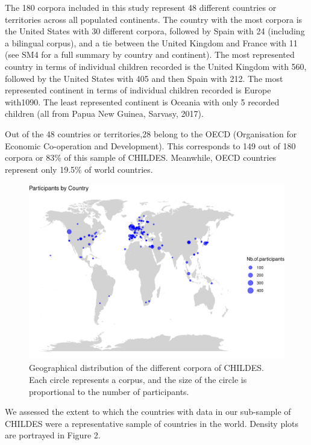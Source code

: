 \documentclass[
  man,floatsintext]{apa6}
\begin{document}
The 180 corpora included in this study represent 48 different countries or territories across all populated continents. The country with the most corpora is the United States with 30 different corpora, followed by Spain with 24 (including a bilingual corpus), and a tie between the United Kingdom and France with 11 (see SM4 for a full summary by country and continent). The most represented country in terms of individual children recorded is the United Kingdom with 560, followed by the United States with 405 and then Spain with 212. The most represented continent in terms of individual children recorded is Europe with1090. The least represented continent is Oceania with only 5 recorded children (all from Papua New Guinea, Sarvasy, 2017).

Out of the 48 countries or territories,28 belong to the OECD (Organisation for Economic Co-operation and Development). This corresponds to 149 out of 180 corpora or 83\% of this sample of CHILDES. Meanwhile, OECD countries represent only 19.5\% of world countries.

\begin{figure}
\centering
\includegraphics{CHILDES_short_files/figure-latex/unnamed-chunk-1-1.pdf}
\caption{\label{fig:unnamed-chunk-1}Geographical distribution of the different corpora of CHILDES. Each circle represents a corpus, and the size of the circle is proportional to the number of participants.}
\end{figure}

We assessed the extent to which the countries with data in our sub-sample of CHILDES were a representative sample of countries in the world. Density plots are portrayed in Figure 2.
\end{document}
